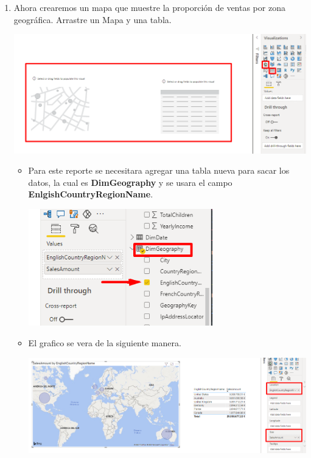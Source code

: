 \documentclass[12pt,letterpaper]{article}
\newcommand\tab[1][1cm]{\hspace*{#1}}
\begin{document}
\begin{enumerate}[\tab 1.]
\begin{center}
        \end{center}
        \item Ahora crearemos un mapa que muestre la proporción de ventas por zona geográfica. Arrastre un Mapa y una tabla.
        \begin{center}
            \includegraphics[width=13cm]{./img/img10.png}
        \end{center}
        \begin{itemize}
            \item Para este reporte se necesitara agregar una tabla nueva para sacar los datos, la cual es \textbf{DimGeography} y se usara el campo \textbf{EnlgishCountryRegionName}. 
            \begin{center}
                \includegraphics[width=8cm]{./img/img10.1.png}
            \end{center}
            \item El grafico se vera de la siguiente manera.
            \begin{center}
                \includegraphics[width=13cm]{./img/img10.2.png}

\end{center}
\end{itemize}
\end{enumerate}
\end{document}
